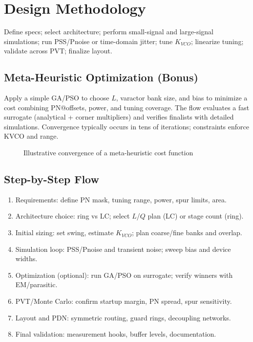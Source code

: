 \chapter{Design Methodology}
Define specs; select architecture; perform small-signal and large-signal simulations; run PSS/Pnoise or time-domain jitter; tune \(K_{VCO}\); linearize tuning; validate across PVT; finalize layout.

\section{Meta-Heuristic Optimization (Bonus)}
Apply a simple GA/PSO to choose \(L\), varactor bank size, and bias to minimize a cost combining PN@offsets, power, and tuning coverage. The flow evaluates a fast surrogate (analytical + corner multipliers) and verifies finalists with detailed simulations. Convergence typically occurs in tens of iterations; constraints enforce KVCO and range.

\begin{figure}[H]
  \centering
  \caption{Illustrative convergence of a meta-heuristic cost function}
\end{figure}

\section{Step-by-Step Flow}
\begin{enumerate}
  \item Requirements: define PN mask, tuning range, power, spur limits, area.
  \item Architecture choice: ring vs LC; select $L$/$Q$ plan (LC) or stage count (ring).
  \item Initial sizing: set swing, estimate $K_{VCO}$; plan coarse/fine banks and overlap.
  \item Simulation loop: PSS/Pnoise and transient noise; sweep bias and device widths.
  \item Optimization (optional): run GA/PSO on surrogate; verify winners with EM/parasitic.
  \item PVT/Monte Carlo: confirm startup margin, PN spread, spur sensitivity.
  \item Layout and PDN: symmetric routing, guard rings, decoupling networks.
  \item Final validation: measurement hooks, buffer levels, documentation.
\end{enumerate}


